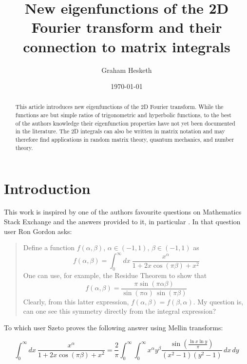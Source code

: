 \documentclass[12pt]{article}
\title{New eigenfunctions of the 2D Fourier transform and their connection to matrix integrals}
\author{Graham Hesketh}
\date{\today}
\begin{document}
\maketitle

\begin{abstract}
This article introduces new eigenfunctions of the 2D Fourier transform. While the functions are but simple ratios of trigonometric and hyperbolic functions, to the best of the authors knowledge their eigenfunction properties have not yet been documented in the literature. The 2D integrals can also be written in matrix notation and may therefore find applications in random matrix theory, quantum mechanics, and number theory.
\end{abstract}

\section{Introduction}
This work is inspired by one of the authors favourite questions on Mathematics Stack Exchange \cite{268789} and the answers provided to it, in particular \cite{3467595}. In that question user Ron Gordon asks:

\begin{quote}
Define a function $f(\alpha, \beta)$, $\alpha \in (-1,1)$, $\beta \in (-1,1)$ as
\begin{equation}
  \label{eq:gordon1}
f(\alpha, \beta) = \int_0^{\infty} dx \: \frac{x^{\alpha}}{1+2 x \cos{(\pi \beta)} + x^2}
\end{equation}
One can use, for example, the Residue Theorem to show that
\begin{equation}
  \label{eq:gordon2}
f(\alpha, \beta) = \frac{\pi \sin{\left (\pi \alpha \beta\right )}}{ \sin{\left (\pi \alpha\right )} \,  \sin{\left (\pi \beta\right )}} 
\end{equation}
Clearly, from this latter expression, $f(\alpha, \beta) = f(\beta, \alpha)$.  My question is, can one see this symmetry directly from the integral expression?
\end{quote}

To which user Szeto proves the following answer using Mellin transforms:

\begin{equation}
\label{eq:szeto}
\int_0^{\infty} dx \: \frac{x^{\alpha}}{1+2 x \cos{(\pi \beta)} + x^2}
= \frac{2}{\pi}\int_0^{\infty} \int^{\infty}_0 x^{\alpha}y^{\beta}\frac{\sin\left(\frac{\ln x \ln y}{\pi}\right)}{(x^2-1)(y^2-1)} \, dx \, dy
\end{equation}
\end{document}
